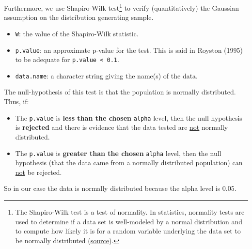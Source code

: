 \documentclass[a4paper]{article}
\begin{document}
    \noindent
    Furthermore, we use Shapiro-Wilk test\footnote{The Shapiro-Wilk test is a test of normality. In statistics, normality tests are used to determine if a data set is well-modeled by a normal distribution and to compute how likely it is for a random variable underlying the data set to be normally distributed (\href{https://en.wikipedia.org/wiki/Normality_test}{source}).} to verify (quantitatively) the Gaussian assumption on the distribution generating sample.
    
    \begin{itemize}
        \item \texttt{W}: the value of the Shapiro-Wilk statistic.
        \item \texttt{p.value}: an approximate p-value for the test. This is said in Royston (1995) to be adequate for \texttt{p.value < 0.1}.
        \item \texttt{data.name}: a character string giving the name(s) of the data.
    \end{itemize}

    \newpage

    \noindent
    The null-hypothesis of this test is that the population is normally distributed. Thus, if:
    \begin{itemize}
        \item The \texttt{p.value} is \textbf{less than the chosen} \texttt{alpha} level, then the null hypothesis is \textbf{rejected} and there is evidence that the data tested are \underline{not} normally distributed.

        \item The \texttt{p.value} is \textbf{greater than the chosen} \texttt{alpha} level, then the null hypothesis (that the data came from a normally distributed population) can \underline{not} be rejected.
    \end{itemize}
    So in our case the data is normally distributed because the alpha level is 0.05.
\end{document}

